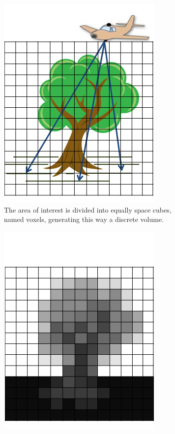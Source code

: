 \documentclass{subfiles}
\begin{document}
\begin{figure} [h!]
\begin{subfigure}[t]{.31\textwidth}
	\includegraphics[width=.9\textwidth]{img/VoxelisationB}
	\caption{The area of interest is divided into equally space cubes, named voxels, generating this way a discrete volume.} 
	\label{fig:VoxelisationB_grid}
\end{subfigure} \hfill
\begin{subfigure}[t]{.31\textwidth}
	\centering
	\includegraphics[width=.9\textwidth]{img/VoxelisationC}

\end{subfigure}
\end{figure}
\end{document}
